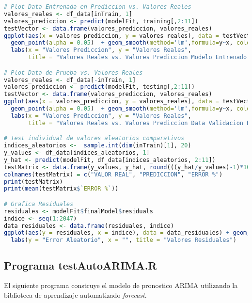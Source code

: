 \begin{lstlisting}[language=R]
# Plot Data Entrenada en Prediccion vs. Valores Reales
valores_reales <- df_data[inTrain, 1]
valores_prediccion <- predict(modelFit, training[,2:11])
testVector <- data.frame(valores_prediccion, valores_reales)
ggplot(aes(x = valores_prediccion, y = valores_reales), data = testVector) + 
  geom_point(alpha = 0.05)  + geom_smooth(method='lm',formula=y~x, colour = "green") + 
  labs(x = "Valores Prediccion", y = "Valores Reales", 
       title = "Valores Reales vs. Valores Prediccion Modelo Entrenado Regresion Multivariable")

# Plot Data de Prueba vs. Valores Reales
valores_reales <- df_data[-inTrain, 1]
valores_prediccion <- predict(modelFit, testing[,2:11])
testVector <- data.frame(valores_prediccion, valores_reales)
ggplot(aes(x = valores_prediccion, y = valores_reales), data = testVector) + 
  geom_point(alpha = 0.05)  + geom_smooth(method='lm',formula=y~x, colour = "yellow") +
  labs(x = "Valores Prediccion", y = "Valores Reales", 
       title = "Valores Reales vs. Valores Prediccion Data Validacion Regresion Multivariable")

# Test individual de valores aleatorios comparativos
indices_aleatorios <-  sample.int(dim(inTrain)[1], 20)
y_values <- df_data[indices_aleatorios, 1]
y_hat <- predict(modelFit, df_data[indices_aleatorios, 2:11])
testMatrix <- data.frame(y_values, y_hat, round(((y_hat/y_values)-1)*100,1))
colnames(testMatrix) = c("VALOR REAL", "PREDICCION", "ERROR %")
print(testMatrix)
print(mean(testMatrix$`ERROR %`))

# Grafica Residuales
residuales <- modelFit$finalModel$residuals
indice <- seq(1:2047)
data_residuales <- data.frame(residuales, indice)
ggplot(aes(y = residuales, x = indice), data = data_residuales) + geom_jitter(alpha = 1/05) +
  labs(y = "Error Aleatorio", x = "", title = "Valores Residuales")
\end{lstlisting}

\subsection{Programa testAutoARIMA.R}
El siguiente programa construye el modelo de pronostico ARIMA utilizando la biblioteca de aprendizaje automatizado \emph{forecast}.

